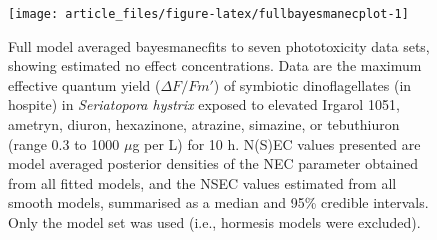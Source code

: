 \documentclass[
  shortnames]{jss}
\begin{document}
\begin{CodeChunk}
\end{CodeChunk}

\newpage

\begin{CodeChunk}
\begin{figure}[!ht]

{\centering \texttt{[image: article\_files/figure-latex/fullbayesmanecplot-1]} 

}

\caption{Full model averaged bayesmanecfits to seven phototoxicity data sets, showing estimated no effect concentrations. Data are the maximum effective quantum yield ($\Delta F / Fm'$) of symbiotic dinoflagellates (in hospite) in \textit{Seriatopora hystrix} exposed to elevated Irgarol 1051, ametryn, diuron, hexazinone, atrazine, simazine, or tebuthiuron (range 0.3 to 1000 $\mu$g per L) for 10 h. N(S)EC values presented are model averaged posterior densities of the NEC parameter obtained from all fitted  models, and the NSEC values estimated from all smooth  models, summarised as a median and 95\% credible intervals. Only the  model set was used (i.e., hormesis models were excluded).}\label{fig:fullbayesmanecplot}
\end{figure}
\end{CodeChunk}

\newpage
\end{document}
